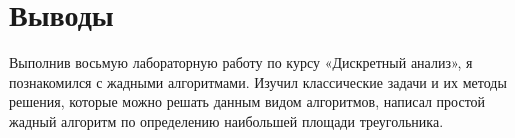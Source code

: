 \section{Выводы}

Выполнив восьмую лабораторную работу по курсу «Дискретный анализ», я познакомился с жадными алгоритмами. Изучил классические задачи и их методы решения, которые можно решать
данным видом алгоритмов, написал простой жадный алгоритм по определению наибольшей площади треугольника.

\pagebreak
